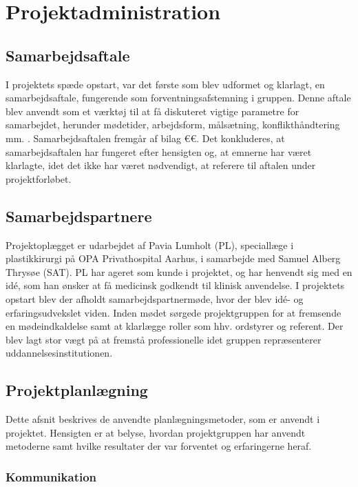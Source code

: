 \chapter{Projektadministration}

\section{Samarbejdsaftale}
I projektets spæde opstart, var det første som blev udformet og klarlagt, en samarbejdsaftale, fungerende som forventningsafstemning i gruppen. Denne aftale blev anvendt som et værktøj til at få diskuteret vigtige parametre for samarbejdet, herunder mødetider, arbejdsform, målsætning, konflikthåndtering mm. \citep{RefWorks:12}. Samarbejdsaftalen fremgår af bilag €€. 
Det konkluderes, at samarbejdsaftalen har fungeret efter hensigten og, at emnerne har været klarlagte, idet det ikke har været nødvendigt, at referere til aftalen under projektforløbet.   
	
\section{Samarbejdspartnere}

	Projektoplægget er udarbejdet af Pavia Lumholt (PL), speciallæge i plastikkirurgi på OPA Privathospital Aarhus, i samarbejde med Samuel Alberg Thrysøe (SAT). PL har ageret som kunde i projektet, og har henvendt sig med en idé, som han ønsker at få medicinsk godkendt til klinisk anvendelse. I projektets opstart blev der afholdt samarbejdspartnermøde, hvor der blev idé- og erfaringsudvekslet viden. Inden mødet sørgede projektgruppen for at fremsende en mødeindkaldelse samt at klarlægge roller som hhv. ordstyrer og referent. Der blev lagt stor vægt på at fremstå professionelle idet gruppen repræsenterer uddannelsesinstitutionen.        
	
\section{Projektplanlægning}
	Dette afsnit beskrives de anvendte planlægningsmetoder, som er anvendt i projektet. Hensigten er at belyse, hvordan projektgruppen har anvendt metoderne samt hvilke resultater der var forventet og erfaringerne heraf.  

\subsection{Kommunikation}

